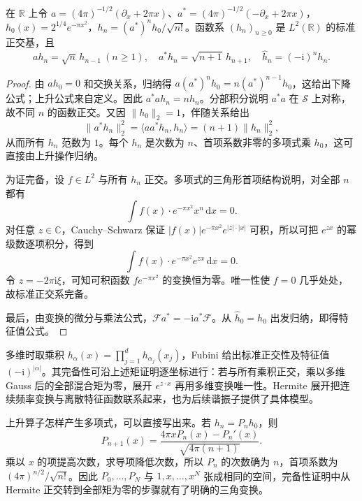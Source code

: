 \begin{theorem}\label{b2:thm:05-hermite}
在 \(\mathbb R\) 上令 \(a=(4\pi)^{-1/2}(\partial_x+2\pi x)\)、\(a^*=(4\pi)^{-1/2}(-\partial_x+2\pi x)\)，\(h_0(x)=2^{1/4}e^{-\pi x^2}\)，\(h_n=(a^*)^nh_0/\sqrt{n!}\)。函数系 \((h_n)_{n\geq0}\) 是 \(L^2(\mathbb R)\) 的标准正交基，且
\[
 ah_n=\sqrt n\,h_{n-1}\ (n\geq1),\quad
 a^*h_n=\sqrt{n+1}\,h_{n+1},\quad
 \widehat h_n=(-\mathrm{i})^nh_n.
\]
\end{theorem}
\begin{proof}
由 \(ah_0=0\) 和交换关系，归纳得 \(a(a^*)^nh_0=n(a^*)^{n-1}h_0\)，这给出下降公式；上升公式来自定义。因此 \(a^*ah_n=nh_n\)。分部积分说明 \(a^*a\) 在 \(\mathcal S\) 上对称，故不同 \(n\) 的函数正交。又因 \(\|h_0\|_2=1\)，伴随关系给出
\[
 \|a^*h_n\|_2^2=\langle aa^*h_n,h_n\rangle
 =(n+1)\|h_n\|_2^2,
\]
从而所有 \(h_n\) 范数为 \(1\)。每个 \(h_n\) 是次数为 \(n\)、首项系数非零的多项式乘 \(h_0\)，这可直接由上升操作归纳。

为证完备，设 \(f\in L^2\) 与所有 \(h_n\) 正交。多项式的三角形首项结构说明，对全部 \(n\) 都有
\[
 \int f(x)\cdot e^{-\pi x^2}x^n\,\mathrm{d}x=0.
\]
对任意 \(z\in\mathbb C\)，Cauchy--Schwarz 保证 \(|f(x)|e^{-\pi x^2}e^{|z|\cdot|x|}\) 可积，所以可把 \(e^{zx}\) 的幂级数逐项积分，得到
\[
 \int f(x)\cdot e^{-\pi x^2}e^{zx}\,\mathrm{d}x=0.
\]
令 \(z=-2\pi\mathrm{i}\xi\)，可知可积函数 \(fe^{-\pi x^2}\) 的变换恒为零。唯一性使 \(f=0\) 几乎处处，故标准正交系完备。

最后，由变换的微分与乘法公式，\(\mathcal F a^*=-\mathrm{i}a^*\mathcal F\)。从 \(\widehat h_0=h_0\) 出发归纳，即得特征值公式。
\end{proof}

多维时取乘积 \(h_\alpha(x)=\prod_{j=1}^dh_{\alpha_j}(x_j)\)，Fubini 给出标准正交性及特征值 \((-\mathrm{i})^{|\alpha|}\)。其完备性可沿上述矩证明逐坐标进行：若与所有乘积正交，乘以多维 Gauss 后的全部混合矩为零，展开 \(e^{z\cdot x}\) 再用多维变换唯一性。Hermite 展开把连续频率变换与离散特征函数联系起来，也为后续谐振子提供了具体模型。

\ProseParagraphBreak

上升算子怎样产生多项式，可以直接写出来。若 \(h_n=P_nh_0\)，则
\[
 P_{n+1}(x)=\frac{4\pi xP_n(x)-P_n'(x)}{\sqrt{4\pi(n+1)}}.
\]
乘以 \(x\) 的项提高次数，求导项降低次数，所以 \(P_n\) 的次数确为 \(n\)，首项系数为 \((4\pi)^{n/2}/\sqrt{n!}\)。因此 \(P_0,\ldots,P_N\) 与 \(1,x,\ldots,x^N\) 张成相同的空间，完备性证明中从 Hermite 正交转到全部矩为零的步骤就有了明确的三角变换。

\ProseParagraphBreak


